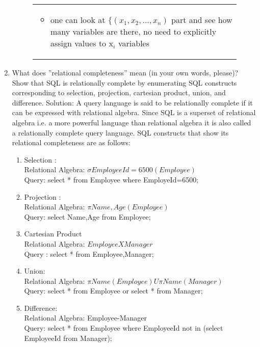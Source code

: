 \documentclass[10pt]{article}
\begin{document}
\begin{enumerate}
\begin{figure}[!htb]
\begin{minipage}{0.5\textwidth}
\begin{tabular}{|p{}}
\begin{itemize}
							\item one can look at  $\{ (x_{1}, x_{2}, ..., x_{n})$ part and see how many variables are there, no need to explicitly assign values to x$_{i}$ variables
						\end{itemize}
					\end{tabular}
				\end{minipage}
			\end{figure}
			
			
			
			\item What does ”relational completeness” mean (in your own words, please)? Show that SQL is
			relationally complete by enumerating SQL constructs corresponding to selection, projection,
			cartesian product, union, and difference.
			Solution: A query language is said to be relationally complete if it can be expressed with relational algebra. Since SQL is a superset of relational algebra i.e. a more powerful language than relational algebra it is also called a relationally complete query language. SQL constructs that show its relational completeness are as follows:
			\begin{enumerate}
			    \item Selection :
			    \\Relational Algebra: $ \sigma EmployeeId=6500(Employee)  $
			    \\Query: select * from Employee where EmployeId=6500;
			    \item Projection :
			    \\ Relational Algebra: $\pi Name,Age(Employee)$
			    \\Query: select Name,Age from Employee;
			    \item Cartesian Product
			    \\Relational Algebra: $Employee X Manager$
			    \\Query : select * from Employee,Manager;
			    \item Union:
			    \\Relational Algebra: $ \pi Name(Employee) U \pi Name(Manager)$
			    \\Query: select * from Employee or select * from Manager;
			    \item Difference:
			    \\Relational Algebra: Employee-Manager
			    \\Query: select * from Employee where EmployeeId not in (select EmployeeId from Manager);
			\end{enumerate}
			

\end{enumerate}
\end{document}
